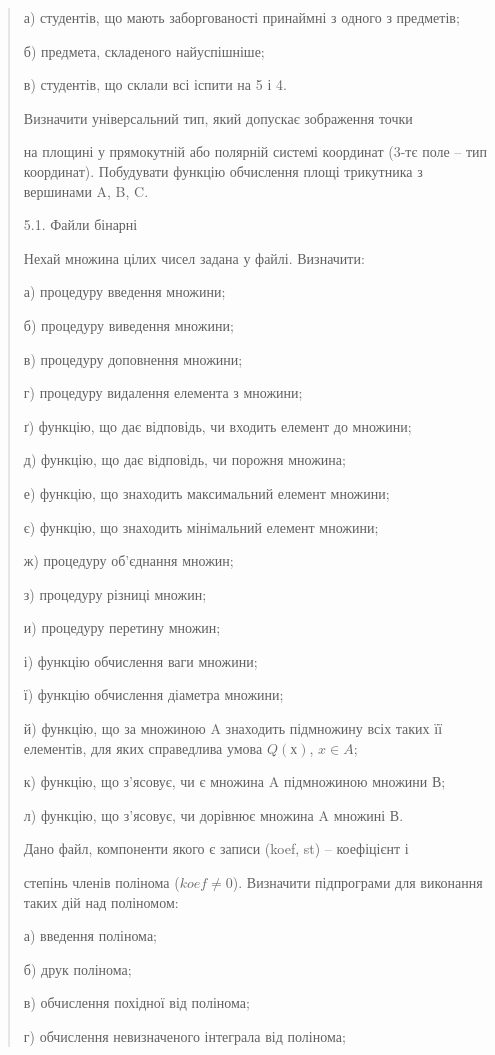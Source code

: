 \documentclass[]{article}
\begin{document}
\begin{quote}
а) студентів, що мають заборгованості принаймні з одного з предметів;

б) предмета, складеного найуспішніше;

в) студентів, що склали всі іспити на 5 і 4.

Визначити універсальний тип, який допускає зображення точки

на площині у прямокутній або полярній системі координат (3-тє поле --
тип координат). Побудувати функцію обчислення площі трикутника з
вершинами A, B, C.

5.1. Файли бінарні

Нехай множина цілих чисел задана у файлі. Визначити:

а) процедуру введення множини;

б) процедуру виведення множини;

в) процедуру доповнення множини;

г) процедуру видалення елемента з множини;

ґ) функцію, що дає відповідь, чи входить елемент до множини;

д) функцію, що дає відповідь, чи порожня множина;

е) функцію, що знаходить максимальний елемент множини;

є) функцію, що знаходить мінімальний елемент множини;

ж) процедуру об'єднання множин;

з) процедуру різниці множин;

и) процедуру перетину множин;

і) функцію обчислення ваги множини;

ї) функцію обчислення діаметра множини;

й) функцію, що за множиною A знаходить підмножину всіх таких її
елементів, для яких справедлива умова $Q(х)$, $x\in A$;

к) функцію, що з'ясовує, чи є множина A підмножиною множини В;

л) функцію, що з'ясовує, чи дорівнює множина A множині В.

Дано файл, компоненти якого є записи (koef, st) -- коефіцієнт і

степінь членів полінома ($koef \neq 0$). Визначити підпрограми для виконання
таких дій над поліномом:

а) введення полінома;

б) друк полінома;

в) обчислення похідної від полінома;

г) обчислення невизначеного інтеграла від полінома;


\end{quote}
\end{document}

